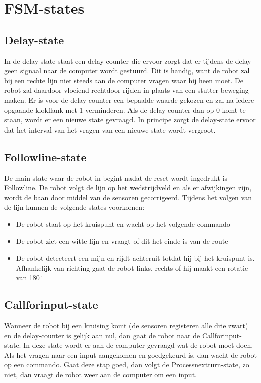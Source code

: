 \documentclass{report}
\begin{document}
\section{FSM-states}

\subsection{Delay-state}
In de delay-state staat een delay-counter die ervoor zorgt dat er tijdens de delay geen signaal naar de computer wordt gestuurd.
Dit is handig, want de robot zal bij een rechte lijn niet steeds aan de computer vragen waar hij heen moet.
De robot zal daardoor vloeiend rechtdoor rijden in plaats van een stutter beweging maken.
Er is voor de delay-counter een bepaalde waarde gekozen en zal na iedere opgaande klokflank met 1 verminderen.
Als de delay-counter dan op 0 komt te staan, wordt er een nieuwe state gevraagd.
In principe zorgt de delay-state ervoor dat het interval van het vragen van een nieuwe state wordt vergroot.

\subsection{Followline-state}
De main state waar de robot in begint nadat de reset wordt ingedrukt is Followline.
De robot volgt de lijn op het wedstrijdveld en als er afwijkingen zijn, wordt de baan door middel van de sensoren gecorrigeerd.
Tijdens het volgen van de lijn kunnen de volgende states voorkomen: 
\begin{itemize}
\item De robot staat op het kruispunt en wacht op het volgende commando
\item De robot ziet een witte lijn en vraagt of dit het einde is van de route
\item De robot detecteert een mijn en rijdt achteruit totdat hij bij het kruispunt is. Afhankelijk van richting gaat de robot links, rechts of hij maakt een rotatie van 180$^\circ$
\end{itemize}

\subsection{Callforinput-state}
Wanneer de robot bij een kruising komt (de sensoren registeren alle drie zwart) en de delay-counter is gelijk aan nul, dan gaat de robot naar de Callforinput-state.
In deze state wordt er aan de computer gevraagd wat de robot moet doen.
Als het vragen naar een input aangekomen en goedgekeurd is, dan wacht de robot op een commando.
Gaat deze stap goed, dan volgt de Processnextturn-state, zo niet, dan vraagt de robot weer aan de computer om een input.
\end{document}
